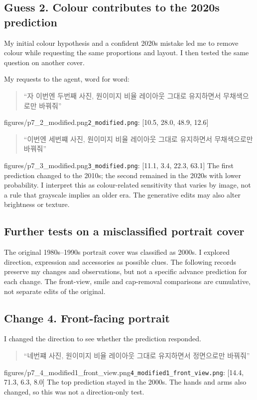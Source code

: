 \documentclass[11pt]{article}
\begin{document}
\subsection*{Guess 2. Colour contributes to the 2020s prediction}
My initial colour hypothesis and a confident 2020s mistake led me to remove colour while requesting the same proportions and layout. I then tested the same question on another cover.

My requests to the agent, word for word:
\begin{quote}“자 이번엔 두번째 사진, 원이미지 비율 레이아웃 그대로 유지하면서 무채색으로만 바꿔줘”\end{quote}
{figures/p7_2_modified.png}{\texttt{2\_modified.png}: [10.5, 28.0, 48.9, 12.6]}
\begin{quote}“이번엔 세번쨰 사진, 원이미지 비율 레이아웃 그대로 유지하면서 무채색으로만 바꿔줘”\end{quote}
{figures/p7_3_modified.png}{\texttt{3\_modified.png}: [11.1, 3.4, 22.3, 63.1]}
The first prediction changed to the 2010s; the second remained in the 2020s with lower probability. I interpret this as colour-related sensitivity that varies by image, not a rule that grayscale implies an older era. The generative edits may also alter brightness or texture.

\subsection*{Further tests on a misclassified portrait cover}
The original 1980s--1990s portrait cover was classified as 2000s. I explored direction, expression and accessories as possible clues. The following records preserve my changes and observations, but not a specific advance prediction for each change. The front-view, smile and cap-removal comparisons are cumulative, not separate edits of the original.

\subsection*{Change 4. Front-facing portrait}
I changed the direction to see whether the prediction responded.
\begin{quote}“네번쨰 사진, 원이미지 비율 레이아웃 그대로 유지하면서 정면으로만 바꿔줘”\end{quote}
{figures/p7_4_modified1_front_view.png}{\texttt{4\_modified1\_front\_view.png}: [14.4, 71.3, 6.3, 8.0]}
The top prediction stayed in the 2000s. The hands and arms also changed, so this was not a direction-only test.
\end{document}
